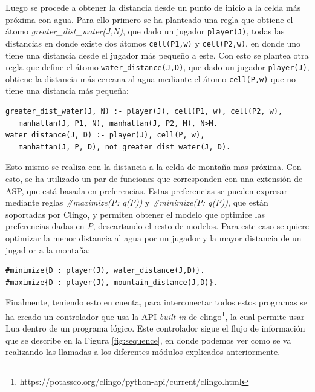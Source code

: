 \hspace{1em}

Luego se procede a obtener la distancia desde un punto de inicio a la celda más próxima con agua. Para ello primero se ha planteado una regla que obtiene el átomo \textit{greater\_dist\_water(J,N)}, que dado un jugador \texttt{player(J)}, todas las distancias en donde existe dos átomos \texttt{cell(P1,w)} y \texttt{cell(P2,w)}, en donde uno tiene una distancia desde el jugador más pequeño a este. Con esto se plantea otra regla que define el átomo \texttt{water\_distance(J,D)}, que dado un jugador \texttt{player(J)}, obtiene la distancia más cercana al agua mediante el átomo \texttt{cell(P,w)} que no tiene una distancia más pequeña: \\

\begin{lstlisting}[label=lst:water]
greater_dist_water(J, N) :- player(J), cell(P1, w), cell(P2, w),
   manhattan(J, P1, N), manhattan(J, P2, M), N>M.
water_distance(J, D) :- player(J), cell(P, w),
   manhattan(J, P, D), not greater_dist_water(J, D).
\end{lstlisting}

\hspace{1em}

Esto mismo se realiza con la distancia a la celda de montaña mas próxima. Con esto, se ha utilizado un par de funciones que corresponden con una extensión de ASP, que está basada en preferencias. Estas preferencias se pueden expresar mediante reglas \textit{\#maximize(P: q(P))} y \textit{\#minimize(P: q(P))}, que están soportadas por Clingo, y permiten obtener el modelo que optimice las preferencias dadas en \textit{P}, descartando el resto de modelos. Para este caso se quiere optimizar la menor distancia al agua por un jugador y la mayor distancia de un jugad	or a la montaña: \\

\begin{lstlisting}[label=lst:water]
#minimize{D : player(J), water_distance(J,D)}.
#maximize{D : player(J), mountain_distance(J,D)}.
\end{lstlisting}

\hspace{1em}

Finalmente, teniendo esto en cuenta, para interconectar todos estos programas se ha creado un controlador que usa la API \textit{built-in} de clingo\footnote{https://potassco.org/clingo/python-api/current/clingo.html}, la cual permite usar Lua dentro de un programa lógico. Este controlador sigue el flujo de información que se describe en la Figura \ref{fig:sequence}, en donde podemos ver como se va realizando las llamadas a los diferentes módulos explicados anteriormente.


